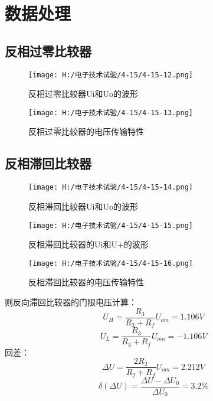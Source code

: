 \documentclass{article}
\begin{document}
\section{ 数据处理}
	\subsection {反相过零比较器}
	
	\begin{figure}[h]
    \begin{minipage}[t]{0.5\linewidth} %

		\centering
		\texttt{[image: H:/电子技术试验/4-15/4-15-12.png]}
		\caption{反相过零比较器Ui和Uo的波形} \label{fig:aa}
  \end{minipage}   
  \begin{minipage}[t]{0.5\linewidth} %
		\centering
		\texttt{[image: H:/电子技术试验/4-15/4-15-13.png]}
		\caption{反相过零比较器的电压传输特性} \label{fig:aa}
  \end{minipage}
  \end{figure}
	\par
\newpage
	\subsection {反相滞回比较器}
    \begin{figure}[h]
      \begin{minipage}[t]{0.5\linewidth} %
		\centering
		\texttt{[image: H:/电子技术试验/4-15/4-15-14.png]}
		\caption{反相滞回比较器Ui和Uo的波形} \label{fig:aa}
	\end{minipage}
  \begin{minipage}[t]{0.5\linewidth} %
		\centering
		\texttt{[image: H:/电子技术试验/4-15/4-15-15.png]}
		\caption{反相滞回比较器的Ui和U+的波形} \label{fig:aa}
	\end{minipage}
  \end{figure}

    \begin{figure}[h]
		\centering
		\texttt{[image: H:/电子技术试验/4-15/4-15-16.png]}
		\caption{反相滞回比较器的电压传输特性} \label{fig:aa}
	\end{figure}
	\par
  则反向滞回比较器的门限电压计算：
  \[U_H=\frac{R_3}{R_3+R_f}U_{om}=1.106V\]
  \[U_L=\frac{R_3}{R_3+R_f}U_{om}=-1.106V\]
  回差：
  \[\Delta U=\frac{2R_2}{R_2+R_f}U_{om}=2.212V\]
  \[\delta (\Delta U)=\frac{\Delta U-\Delta U_0}{\Delta U_0}=3.2\%\]
  \newpage
\end{document}
